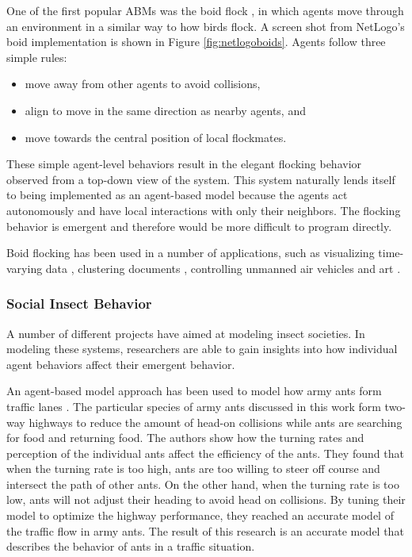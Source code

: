 One of the first popular ABMs was the boid flock \cite{reynolds1987}\cite{reynolds1999sba}, in which agents move through an environment in a similar way to how birds flock.
A screen shot from NetLogo's boid implementation \cite{flocking} is shown in Figure \ref{fig:netlogoboids}.
Agents follow three simple rules:
   \begin{itemize}
      \item move away from other agents to avoid collisions,
      \item align to move in the same direction as nearby agents, and
      \item move towards the central position of local flockmates.
   \end{itemize}
These simple agent-level behaviors result in the elegant flocking behavior observed from a top-down view of the system.
This system naturally lends itself to being implemented as an agent-based model because the agents act autonomously and have local interactions with only their neighbors.
The flocking behavior is emergent and therefore would be more difficult to program directly.

Boid flocking has been used in a number of applications, such as visualizing time-varying data \cite{1382896}, clustering documents \cite{cui2006flocking}, controlling unmanned air vehicles \cite{crowther2003flocking} and art \cite{Boyd}.

\subsubsection{Social Insect Behavior}

A number of different projects have aimed at modeling insect societies.
In modeling these systems, researchers are able to gain insights into how individual agent behaviors affect their emergent behavior.

An agent-based model approach has been used to model how army ants form traffic lanes \cite{couzin2003sol}.
The particular species of army ants discussed in this work form two-way highways to reduce the amount of head-on collisions while ants are searching for food and returning food.
The authors show how the turning rates and perception of the individual ants affect the efficiency of the ants.
They found that when the turning rate is too high, ants are too willing to steer off course and intersect the path of other ants.
On the other hand, when the turning rate is too low, ants will not adjust their heading to avoid head on collisions.
By tuning their model to optimize the highway performance, they reached an accurate model of the traffic flow in army ants.
The result of this research is an accurate model that describes the behavior of ants in a traffic situation.


